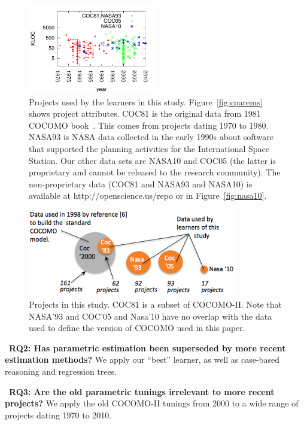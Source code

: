 \documentclass[smallcondesed]{svjour3}
\newcommand{\fig}[1]{Figure~\ref{fig:#1}}
\newcommand{\ADD}[1]{#1}
\begin{document}
\begin{figure}[!b]
\begin{minipage}{2.3in}
\noindent\includegraphics[width=2.2in]{yearLOC.pdf}
\end{minipage}
\caption{Projects used by the learners in this study. \fig{cparems}
shows project attributes. 
COC81 is the original data from 1981 COCOMO book~\cite{boehm81}. 
This comes from projects dating 1970 to 1980.
NASA93 is NASA data collected  in the early 1990s
 about software that supported  the planning activities for the International
Space Station. 
Our other data sets are  NASA10 and COC05 (the latter is
proprietary and 
cannot be released to the research community). 
The non-proprietary data  (COC81 and NASA93 and NASA10) is available at
http://openscience.us/repo or in \fig{nasa10}.
}\label{fig:types}
\end{figure}

\begin{figure}[!b]
\begin{center}
\includegraphics[width=3.6in]{datasets1.png}
\end{center}
\caption{\ADD{Projects in this study. COC81 is a subset of COCOMO-II.  Note that NASA'93 and
COC'05 and Nasa'10 have no
overlap with the data used to define the version of COCOMO
used in this paper. }}\label{fig:dataused}
\end{figure} 

  


~{\bf RQ2: Has parametric estimation been superseded
 by more recent estimation methods?}  We  
 apply our ``best''
learner, as well as 
case-based reasoning and regression trees.

~{\bf RQ3: Are the old parametric tunings irrelevant
  to more recent projects?}  We apply the old
COCOMO-II tunings from 2000 to a wide range of projects dating 
1970 to 2010.
\end{document}
